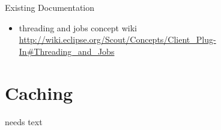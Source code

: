 \documentclass[a4paper,10pt,twoside]{book}
\begin{document}
\noindent Existing Documentation
\begin{itemize}
  \item threading and jobs concept wiki \url{http://wiki.eclipse.org/Scout/Concepts/Client_Plug-In#Threading_and_Jobs}
\end{itemize}


\section{Caching}
needs text


\ifx\wholebook\relax\else
   
   
\end{document}
